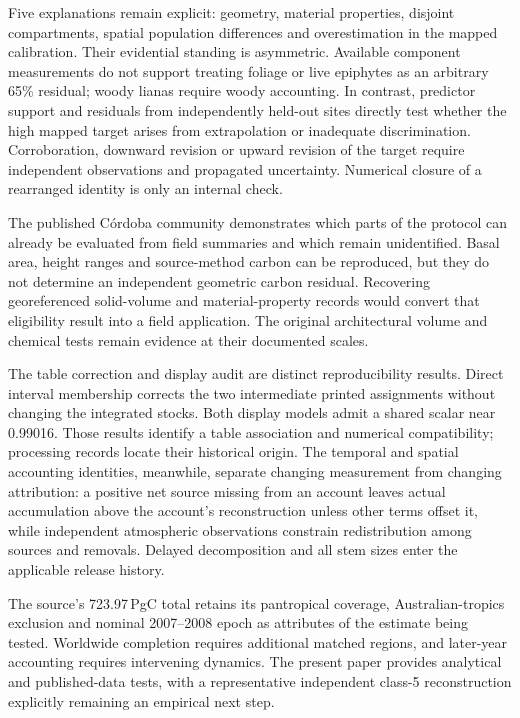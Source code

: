\documentclass[11pt,a4paper]{article}
\theoremstyle{remark}
\begin{document}
Five explanations remain explicit: geometry, material properties, disjoint compartments, spatial population differences and overestimation in the mapped calibration. Their evidential standing is asymmetric. Available component measurements do not support treating foliage or live epiphytes as an arbitrary 65\% residual; woody lianas require woody accounting. In contrast, predictor support and residuals from independently held-out sites directly test whether the high mapped target arises from extrapolation or inadequate discrimination. Corroboration, downward revision or upward revision of the target require independent observations and propagated uncertainty. Numerical closure of a rearranged identity is only an internal check.

The published C\'ordoba community demonstrates which parts of the protocol can already be evaluated from field summaries and which remain unidentified. Basal area, height ranges and source-method carbon can be reproduced, but they do not determine an independent geometric carbon residual. Recovering georeferenced solid-volume and material-property records would convert that eligibility result into a field application. The original architectural volume and chemical tests remain evidence at their documented scales.

The table correction and display audit are distinct reproducibility results. Direct interval membership corrects the two intermediate printed assignments without changing the integrated stocks. Both display models admit a shared scalar near 0.99016. Those results identify a table association and numerical compatibility; processing records locate their historical origin. The temporal and spatial accounting identities, meanwhile, separate changing measurement from changing attribution: a positive net source missing from an account leaves actual accumulation above the account's reconstruction unless other terms offset it, while independent atmospheric observations constrain redistribution among sources and removals. Delayed decomposition and all stem sizes enter the applicable release history.

The source's 723.97\,PgC total retains its pantropical coverage, Australian-tropics exclusion and nominal 2007--2008 epoch as attributes of the estimate being tested. Worldwide completion requires additional matched regions, and later-year accounting requires intervening dynamics. The present paper provides analytical and published-data tests, with a representative independent class-5 reconstruction explicitly remaining an empirical next step.
\end{document}
